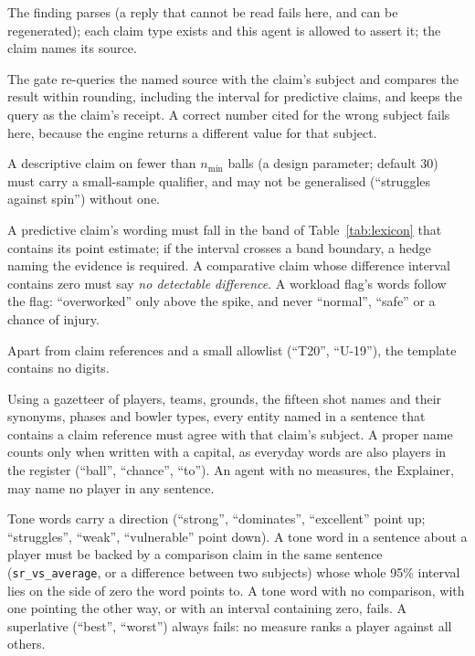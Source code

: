 \documentclass[11pt,a4paper]{article}
\begin{document}
\begin{description}[leftmargin=1.2em,style=nextline,itemsep=2pt]
\item[C1 --- Schema and registry.] The finding parses (a reply that cannot be read
  fails here, and can be regenerated); each claim type exists
  and this agent is allowed to assert it; the claim names its source.
\item[C2 --- Subject-bound value.] The gate re-queries the named source with the
  claim's subject and compares the result within rounding, including the
  interval for predictive claims, and keeps the query as the claim's receipt. A
  correct number cited for the wrong subject fails here, because the engine
  returns a different value for that subject.
\item[C3 --- Evidence floor.] A descriptive claim on fewer than $n_{\min}$ balls
  (a design parameter; default 30) must carry a small-sample qualifier, and may
  not be generalised (``struggles against spin'') without one.
\item[C4 --- Interval and wording.] A predictive claim's wording must fall in
  the band of Table~\ref{tab:lexicon} that contains its point estimate; if the
  interval crosses a band boundary, a hedge naming the evidence is required. A
  comparative claim whose difference interval contains zero must say \emph{no
  detectable difference}. A workload flag's words follow the flag: ``overworked''
  only above the spike, and never ``normal'', ``safe'' or a chance of injury.
\item[C5 --- No orphan numbers.] Apart from claim references and a small
  allowlist (``T20'', ``U-19''), the template contains no digits.
\item[C6 --- Prose subjects agree.] Using a gazetteer of players, teams, grounds,
  the fifteen shot names and their synonyms, phases and bowler types, every entity
  named in a sentence that contains a claim reference must agree with that
  claim's subject. A proper name counts only when written with a capital, as
  everyday words are also players in the register (``ball'', ``chance'', ``to'').
  An agent with no measures, the Explainer, may name no player in any sentence.
\item[C7 --- Tone words backed (new).] Tone words carry a direction
  (``strong'', ``dominates'', ``excellent'' point up; ``struggles'', ``weak'',
  ``vulnerable'' point down). A tone word in a sentence about a player must be
  backed by a comparison claim in the same sentence (\texttt{sr\_vs\_average},
  or a difference between two subjects) whose whole 95\% interval lies on the
  side of zero the word points to. A tone word with no comparison, with one
  pointing the other way, or with an interval containing zero, fails. A
  superlative (``best'', ``worst'') always fails: no measure ranks a player
  against all others.
\end{description}
\end{document}
